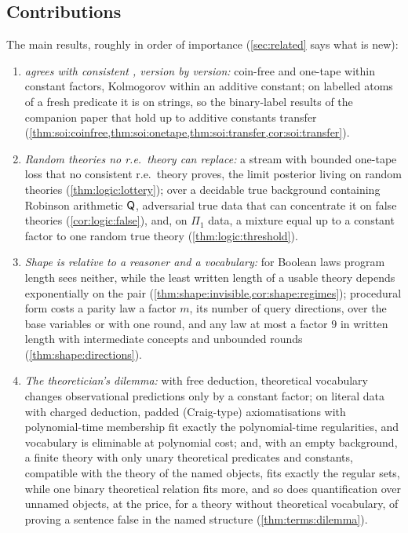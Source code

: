 \subsection{Contributions}\label{sec:intro:contrib}

The main results, roughly in order of importance (\cref{sec:related} says what is new):
\begin{enumerate}[leftmargin=*,label=(\arabic*)]
\item \emph{\SAIabbr agrees with consistent \SOIabbr, version by version:} coin-free and one-tape within constant factors, Kolmogorov within an additive constant; on labelled atoms of a fresh predicate it is \SOIabbr on strings, so the binary-label results of the companion paper that hold up to additive constants transfer (\cref{thm:soi:coinfree,thm:soi:onetape,thm:soi:transfer,cor:soi:transfer}).
\item \emph{Random theories no r.e.\ theory can replace:} a stream with bounded one-tape loss that no consistent r.e.\ theory proves, the limit posterior living on random theories (\cref{thm:logic:lottery}); over a decidable true background containing Robinson arithmetic $\mathsf{Q}$, adversarial true data that can concentrate it on false theories (\cref{cor:logic:false}), and, on $\Pi_1$ data, a mixture equal up to a constant factor to one random true theory (\cref{thm:logic:threshold}).
\item \emph{Shape is relative to a reasoner and a vocabulary:} for Boolean laws program length sees neither, while the least written length of a usable theory depends exponentially on the pair (\cref{thm:shape:invisible,cor:shape:regimes}); procedural form costs a parity law a factor $m$, its number of query directions, over the base variables or with one round, and any law at most a factor $9$ in written length with intermediate concepts and unbounded rounds (\cref{thm:shape:directions}).
\item \emph{The theoretician's dilemma:} with free deduction, theoretical vocabulary changes observational predictions only by a constant factor; on literal data with charged deduction, padded (Craig-type) axiomatisations with polynomial-time membership fit exactly the polynomial-time regularities, and vocabulary is eliminable at polynomial cost; and, with an empty background, a finite theory with only unary theoretical predicates and constants, compatible with the theory of the named objects, fits exactly the regular sets, while one binary theoretical relation fits more, and so does quantification over unnamed objects, at the price, for a theory without theoretical vocabulary, of proving a sentence false in the named structure (\cref{thm:terms:dilemma}).

\end{enumerate}
